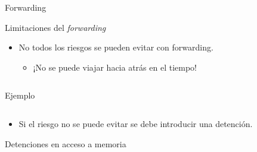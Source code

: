 \begin{frame}[t]{Forwarding}
\makebox[\textwidth][c]{

}
\end{frame}

\begin{frame}[t,fragile]{Limitaciones del \emph{forwarding}}
\begin{itemize}
  \item No todos los riesgos se pueden evitar con forwarding.
    \begin{itemize}
      \item ¡No se puede viajar hacia atrás en el tiempo!
    \end{itemize}
\end{itemize}

\begin{columns}

\begin{column}{.4\textwidth}
\begin{block}{Ejemplo}

\end{block}
\end{column}

\begin{column}{.6\textwidth}
\makebox[\textwidth][c]{

}\end{column}

\end{columns}
\begin{itemize}
  \item Si el riesgo no se puede evitar se debe introducir una detención.
\end{itemize}

\end{frame}

\begin{frame}[t]{Detenciones en acceso a memoria}
\makebox[\textwidth][c]{

}
\end{frame}
